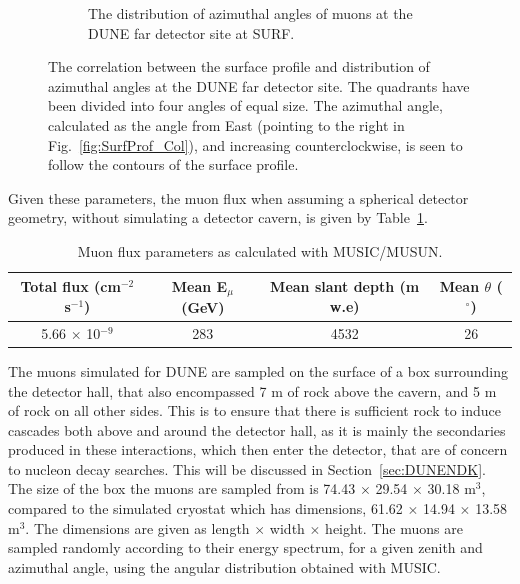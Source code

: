 \begin{figure}[h!]
\begin{subfigure}{0.45\textwidth}
    \caption{The distribution of azimuthal angles of muons at the DUNE far detector site at SURF.}
    \label{fig:SurfProf_Azi}
  \end{subfigure}
  \caption[The correlation between the surface profile and distribution of azimuthal angles at the DUNE far detector site]
          {The correlation between the surface profile and distribution of azimuthal angles at the DUNE far detector site. The quadrants have been divided into four angles of equal size. The azimuthal angle, calculated as the angle from East (pointing to the right in Fig.~\ref{fig:SurfProf_Col}), and increasing counterclockwise, is seen to follow the contours of the surface profile.}
\end{figure}

Given these parameters, the muon flux when assuming a spherical detector geometry, without simulating a detector cavern, is given by Table~\ref{tab:MUSUNflux}. \\
\begin{table}[h!]
\caption[Muon flux parameters as calculated with MUSIC/MUSUN.]
        {Muon flux parameters as calculated with MUSIC/MUSUN.}
\centering
\label{tab:MUSUNflux}
\begin{tabular}{c c c c}
\toprule
{Total flux (cm$^{-2}$ s$^{-1}$)} & {Mean E$_{\mu}$ (GeV)} & {Mean slant depth (m w.e)} & {Mean $\theta$ ($^{\circ}$)} \\ 
\midrule
5.66 $\times$ 10$^{-9}$           & 283                    & 4532                       & 26                           \\
\bottomrule
\end{tabular}
\end{table}

The muons simulated for DUNE are sampled on the surface of a box surrounding the detector hall, that also encompassed 7 m of rock above the cavern, and 5 m of rock on all other sides. This is to ensure that there is sufficient rock to induce cascades both above and around the detector hall, as it is mainly the secondaries produced in these interactions, which then enter the detector, that are of concern to nucleon decay searches. This will be discussed in Section~\ref{sec:DUNENDK}. The size of the box the muons are sampled from is 74.43 $\times$ 29.54 $\times$ 30.18 m$^3$, compared to the simulated cryostat which has dimensions, 61.62 $\times$ 14.94 $\times$ 13.58 m$^3$. The dimensions are given as length $\times$ width $\times$ height. The muons are sampled randomly according to their energy spectrum, for a given zenith and azimuthal angle, using the angular distribution obtained with MUSIC. \\

